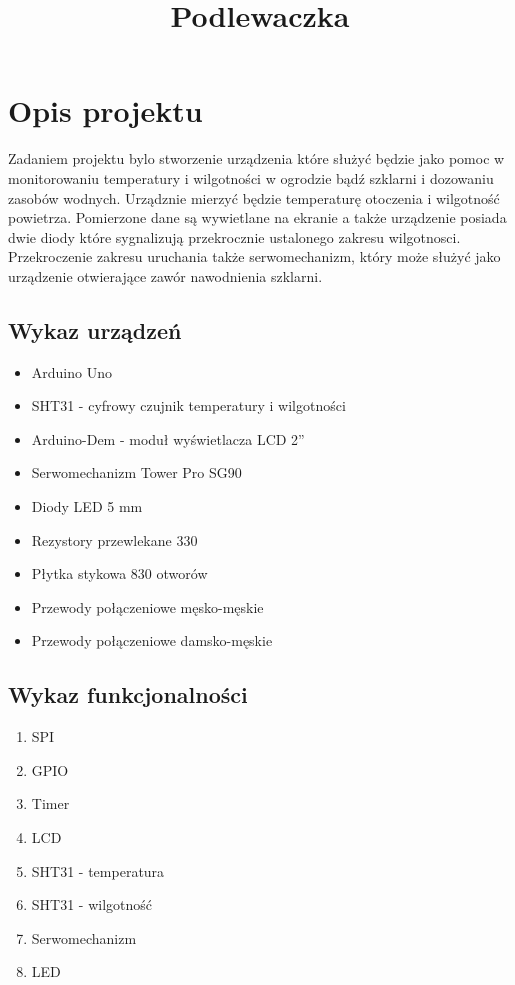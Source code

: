 \documentclass{classrep}
\author{
  \studentinfo{KONRAD PŁAWIK}{191458} \and
  \studentinfo{Vladislav Mazur}{199185} \and
  \studentinfo{Łukasz Połubiński}{211833}
}
\title{Podlewaczka}
\begin{document}
\maketitle
\newpage
\tableofcontents
\newpage

\section {Opis projektu}
Zadaniem projektu bylo stworzenie urządzenia które służyć będzie jako pomoc w monitorowaniu temperatury i wilgotności w ogrodzie bądź szklarni i dozowaniu zasobów wodnych. Urządznie mierzyć będzie temperaturę otoczenia i wilgotność powietrza. Pomierzone dane są wywietlane na ekranie a także urządzenie posiada dwie diody które sygnalizują przekrocznie ustalonego zakresu wilgotnosci. Przekroczenie zakresu uruchania także serwomechanizm, który może służyć jako urządzenie otwierające zawór nawodnienia szklarni.\\

\subsection {Wykaz urządzeń}
\begin{itemize} 
  \item Arduino Uno
  \item SHT31 - cyfrowy czujnik temperatury i wilgotności
  \item Arduino-Dem - moduł wyświetlacza LCD 2''
  \item Serwomechanizm Tower Pro SG90
  \item Diody LED 5 mm
  \item Rezystory przewlekane 330 \ohm
  \item Płytka stykowa 830 otworów
  \item Przewody połączeniowe męsko-męskie
  \item Przewody połączeniowe damsko-męskie
\end{itemize}

\subsection {Wykaz funkcjonalności}
\begin{enumerate}
  \item SPI
  \item GPIO
  \item Timer
  \item LCD
  \item SHT31 - temperatura
  \item SHT31 - wilgotność
  \item Serwomechanizm
  \item LED
\end{enumerate}
\end{document}
